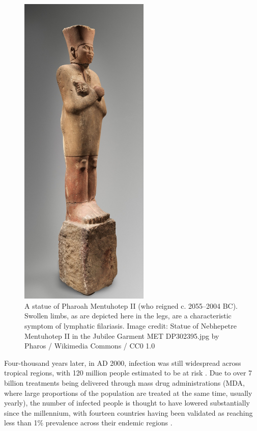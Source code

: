 \begin{figure}
    \centering
    \includegraphics[height=15.3cm]{Project/Figures/LFElimination/Mentuhotep.jpg}
    \caption[Statue of Pharoah Mentuhotep II.]{A statue of Pharoah Mentuhotep  II (who reigned c. 2055--2004 BC). Swollen limbs, as are depicted here in the legs, are a characteristic symptom of lymphatic filariasis. Image credit: Statue of Nebhepetre Mentuhotep II in the Jubilee Garment MET DP302395.jpg by Pharos / Wikimedia Commons / CC0 1.0}
    \label{fig:Pharoh}
\end{figure}

Four-thousand years later, in AD 2000, infection was still widespread across tropical regions, with 120 million people estimated to be at risk \cite{Melrose2004}. Due to over 7 billion treatments being delivered through mass drug administrations (MDA, where large proportions of the population are treated at the same time, usually yearly), the number of infected people is thought to have lowered substantially since the millennium, with fourteen countries having been validated as reaching less than 1\% prevalence across their endemic regions \cite{WHOLF,WHOWER}. 

